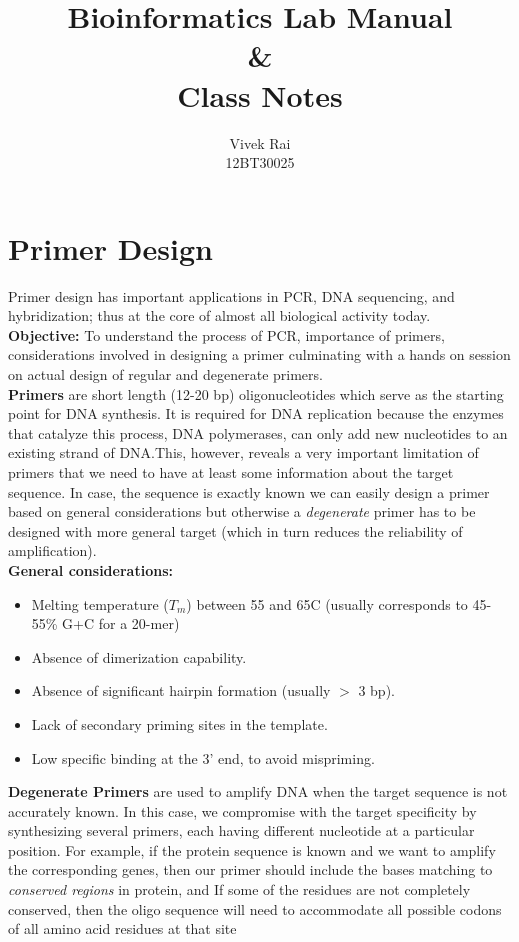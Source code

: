 \documentclass[12pt,a4paper]{report}
\title{Bioinformatics Lab Manual \\ \& \\ Class Notes}
\author{Vivek Rai \\ \textnormal{12BT30025}}
\begin{document}
\maketitle

\chapter*{Primer Design}

Primer design has important applications in PCR, DNA sequencing, and 
hybridization; thus at the core of almost all biological activity today.\\

\textbf{Objective:} To understand the process of PCR, importance of primers, 
considerations involved in designing a primer culminating with a hands on 
session on actual design of regular and degenerate primers.\\

\noindent
\textbf{Primers} are short length (12-20 bp) oligonucleotides which serve as 
the starting point for DNA synthesis. It is required for DNA replication 
because the enzymes that catalyze this process, DNA polymerases, can only add 
new nucleotides to an existing strand of DNA.This, however, reveals a very 
important limitation of primers that we need to 
have at least some information about the target sequence. In case, the sequence 
is exactly known we can easily design a primer based on general considerations 
but otherwise a \textit{degenerate} primer has to be designed with more general 
target (which in turn reduces the reliability of amplification).\\

\textbf{General considerations:}
\begin{itemize}
    \item Melting temperature ($T_m$) between 55 and 65\degree C (usually 
    corresponds 
    to 45-55\% G+C for a 20-mer)
    \item Absence of dimerization capability.
    \item Absence of significant hairpin formation (usually $>$ 3 bp).
    \item Lack of secondary priming sites in the template.
    \item Low specific binding at the 3' end, to avoid mispriming.
    \end{itemize}

\noindent
\textbf{Degenerate Primers} are used to amplify DNA when the target sequence is 
not accurately known. In this case, we compromise with the target specificity 
by synthesizing several primers, each having different nucleotide at a 
particular position. For example, if the protein sequence is known and we want 
to amplify the corresponding genes, then our primer should include the bases 
matching to \textit{conserved regions} in protein, and If some of the residues 
are not completely conserved, then the oligo sequence will need to accommodate 
all possible codons of all amino acid residues at that site
\end{document}
